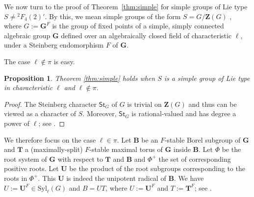 \documentclass[12pt]{amsart}
\newtheorem{proposition}[theorem]{Proposition}
\theoremstyle{definition}
\numberwithin{equation}{section}
\newcommand{\Syl}{{\mathrm {Syl}}}
\newcommand{\St}{{\mathsf {St}}}
\newcommand{\bG}{{\mathbf{G}}}
\newcommand{\bT}{{\mathbf{T}}}
\newcommand{\bB}{{\mathbf{B}}}
\newcommand{\bU}{{\mathbf{U}}}
\newcommand{\bZ}{{\mathbf{Z}}}
\begin{document}
We now %
turn to the proof of Theorem~\ref{thm:simple} for simple
groups of Lie type $S \neq {}^2F_4(2)'$. By this, we mean simple
groups of the form $S = G/\bZ(G)$%
, where $G := \bG^F$ is the group %
of fixed points of a simple, simply connected algebraic group $\bG$
defined over an %
algebraically closed field of characteristic $\ell$,
under a Steinberg %
endomorphism $F$ of %
$\bG$.

The %
case $\ell\notin\pi$ is %
easy.

\begin{proposition}\label{prop:ell-notin-pi}
Theorem \ref{thm:simple} holds when $S$ is a simple group of Lie
type in characteristic $\ell$ and $\ell\notin\pi$.
\end{proposition}

\begin{proof}
The Steinberg character $\St_G$ of $G$ is trivial on $\bZ(G)$ and
thus can be viewed as a character of $S$. Moreover, $\St_G$ is
rational-valued and has degree a power of $\ell$; see
\cite[Proposition~3.4.10]{GeckMalle}.
\end{proof}

We therefore focus on the case $\ell\in\pi$. Let $\bB$ be an
$F$-stable Borel subgroup of $\bG$ and $\bT$ a (maximally-split)
$F$-stable maximal torus of $\bG$ inside $\bB$. Let $\Phi$ be the
root system of $\bG$ with respect to $\bT$ and $\bB$ and $\Phi^+$
the set of corresponding positive roots. Let $\bU$ be the product of
the root subgroups corresponding to the roots in $\Phi^+$. This
$\bU$ is indeed the unipotent radical of $\bB$. We have
$U:=\bU^F\in\Syl_\ell(G)$ and $B=UT$, %
where $U:=\bU^F$ and
$T:=\bT^F$; see %
\cite[\S1.9 and \S2.9]{Carter85}.
\end{document}
